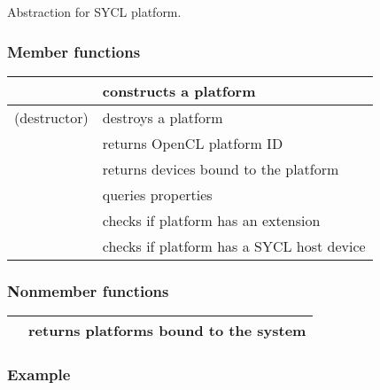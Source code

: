 \documentclass[letterpaper,10pt,english]{sphinxmanual}
\begin{document}
Abstraction for SYCL platform.
\subsubsection*{Member functions}


\begin{savenotes}\sphinxattablestart
\centering
\begin{tabulary}{\linewidth}[t]{|T|T|}
\hline

{\hyperref[\detokenize{programming-interface/runtime/platform:constructor}]{}}
&
constructs a platform
\\
\hline
(destructor)
&
destroys a platform
\\
\hline
{\hyperref[\detokenize{programming-interface/runtime/platform:get}]{}}
&
returns OpenCL platform ID
\\
\hline
{\hyperref[\detokenize{programming-interface/runtime/platform:get-devices}]{}}
&
returns devices bound to the platform
\\
\hline
{\hyperref[\detokenize{programming-interface/runtime/platform:get-info}]{}}
&
queries properties
\\
\hline
{\hyperref[\detokenize{programming-interface/runtime/platform:has-extension}]{}}
&
checks if platform has an extension
\\
\hline
{\hyperref[\detokenize{programming-interface/runtime/platform:is-host}]{}}
&
checks if platform has a SYCL host device
\\
\hline
\end{tabulary}
\par
\sphinxattableend\end{savenotes}
\subsubsection*{Non\sphinxhyphen{}member functions}


\begin{savenotes}\sphinxattablestart
\centering
\begin{tabulary}{\linewidth}[t]{|T|T|}
\hline

{\hyperref[\detokenize{programming-interface/runtime/platform:get-platforms}]{}}
&
returns platforms bound to the system
\\
\hline
\end{tabulary}
\par
\sphinxattableend\end{savenotes}
\label{\detokenize{programming-interface/runtime/platform:platform-example}}\subsubsection*{Example}
\end{document}
